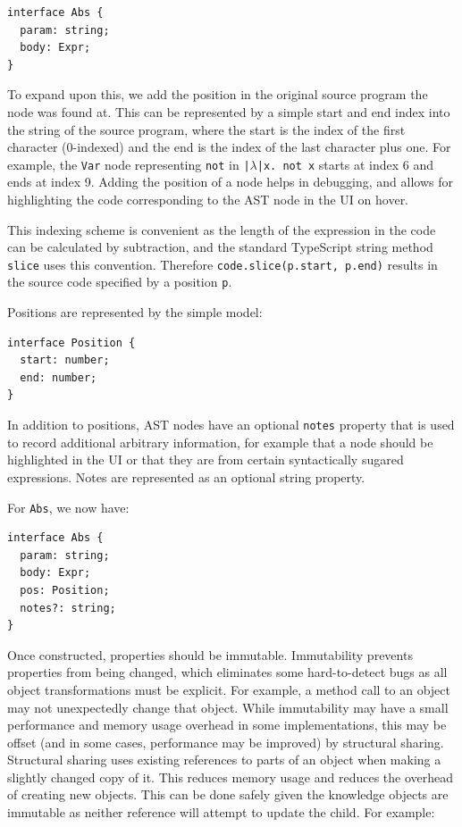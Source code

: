 \documentclass[a4paper,fleqn,oneside,12pt]{report}
\begin{document}
\begin{verbatim}
interface Abs {
  param: string;
  body: Expr;
}
\end{verbatim}
To expand upon this, we add the position in the original source program the node was found at. This can be represented by a simple start and end index into the string of the source program, where the start is the index of the first character (0-indexed) and the end is the index of the last character plus one. For example, the \texttt{Var} node representing \texttt{not} in \texttt{|$\lambda$|x. not x} starts at index 6 and ends at index 9. Adding the position of a node helps in debugging, and allows for highlighting the code corresponding to the AST node in the UI on hover.

This indexing scheme is convenient as the length of the expression in the code can be calculated by subtraction, and the standard TypeScript string method \texttt{slice} uses this convention. Therefore \texttt{code.slice(p.start, p.end)} results in the source code specified by a position \texttt{p}.

Positions are represented by the simple model:

\begin{verbatim}
interface Position {
  start: number;
  end: number;
}
\end{verbatim}
In addition to positions, AST nodes have an optional \texttt{notes} property that is used to record additional arbitrary information, for example that a node should be highlighted in the UI or that they are from certain syntactically sugared expressions. Notes are represented as an optional string property.

For \texttt{Abs}, we now have:

\begin{verbatim}
interface Abs {
  param: string;
  body: Expr;
  pos: Position;
  notes?: string;
}
\end{verbatim}
Once constructed, properties should be immutable. Immutability prevents properties from being changed, which eliminates some hard-to-detect bugs as all object transformations must be explicit. For example, a method call to an object may not unexpectedly change that object. While immutability may have a small performance and memory usage overhead in some implementations, this may be offset (and in some cases, performance may be improved) by structural sharing. Structural sharing uses existing references to parts of an object when making a slightly changed copy of it. This reduces memory usage and reduces the overhead of creating new objects. This can be done safely given the knowledge objects are immutable as neither reference will attempt to update the child. For example:
\end{document}

